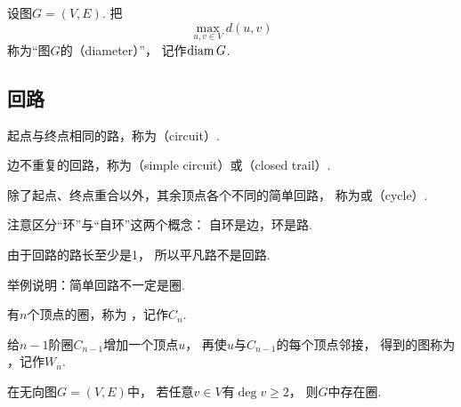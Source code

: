 \begin{definition}
设图\(G = (V,E)\).
把\[
	\max_{u,v \in V} d(u,v)
\]称为“图\(G\)的（diameter）”，
记作\(\operatorname{diam} G\).
\end{definition}

\subsection{回路}
\begin{definition}
起点与终点相同的路，称为（circuit）.
\end{definition}

\begin{definition}
边不重复的回路，称为（simple circuit）或（closed trail）.
\end{definition}

\begin{definition}
除了起点、终点重合以外，其余顶点各个不同的简单回路，
称为或（cycle）.
\end{definition}
\begin{remark}
注意区分“环”与“自环”这两个概念：
自环是边，环是路.
\end{remark}

由于回路的路长至少是1，
所以平凡路不是回路.

\begin{example}
举例说明：简单回路不一定是圈.
\end{example}

\begin{definition}
有\(n\)个顶点的圈，称为 ，记作\(C_n\).
\end{definition}

\begin{definition}
给\(n-1\)阶圈\(C_{n-1}\)增加一个顶点\(u\)，
再使\(u\)与\(C_{n-1}\)的每个顶点邻接，
得到的图称为 ，记作\(W_n\).
\end{definition}

\begin{theorem}
在无向图\(G = (V,E)\)中，
若任意\(v \in V\)有\(\deg v \geq 2\)，
则\(G\)中存在圈.
\end{theorem}

